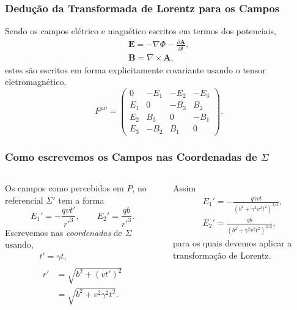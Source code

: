 \documentclass[xcolor=dvipsnames]{beamer}
\renewcommand{\vec}{\mathbf}
\begin{document}
\appendix
\begin{frame}
	\frametitle{Dedução da Transformada de Lorentz para os Campos}
	Sendo os campos elétrico e magnético escritos em termos dos potenciais,
	\begin{gather}
		\vec{E} = - \nabla \Phi - \frac{\partial \vec{A}}{\partial t}, \\
		\vec{B} = \nabla \times \vec{A},
	\end{gather}
	estes são escritos em forma explicitamente covariante usando o tensor
	eletromagnético,
	\begin{equation}
		F^{\mu \nu} = \begin{pmatrix}
			0 & -E_1 & -E_2 & -E_3 \\
			E_1 & 0 & -B_3 & B_2 \\
			E_2 & B_3 & 0 & -B_1 \\
			E_3 & -B_2 & B_1 & 0
		\end{pmatrix}.
	\end{equation}
\end{frame}

\begin{frame}
	\frametitle{Como escrevemos os Campos nas Coordenadas de $\Sigma$}
	\begin{columns}

		Os campos como percebidos em $P$, no referencial $\Sigma '$ tem a forma
		\begin{equation}
			E_1 ' = -\frac{qvt'}{{r'} ^3}, \qquad E_2 ' = \frac{qb}{{r'}^3}.
		\end{equation}
		Escrevemos nas \textit{coordenadas} de $\Sigma$ usando,
		\begin{gather}
			t' = \gamma t, \\
			\begin{split}
				r ' &= \sqrt{b^2 + (v t')^2} \\
					&= \sqrt{b^2 + v^2 \gamma ^2 t^2}.
			\end{split}
		\end{gather}

		Assim
		\begin{gather}
			E _1 '= - \frac{q\gamma vt}{(b^2 + \gamma ^2 v^2 t^2)^{3/2}},\\
			E _2 '= \frac{qb}{(b^2 + \gamma ^2 v^2 t^2)^{3/2}},
		\end{gather}
		para os quais devemos aplicar a transformação de Lorentz.
	\end{columns}
\end{frame}
\end{document}
